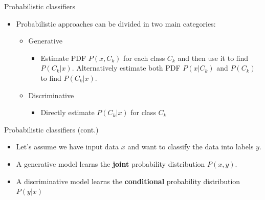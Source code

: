\documentclass[serif, aspectratio=169]{beamer}
\begin{document}
    \begin{frame}{Probabilistic classifiers}
        \begin{itemize}
            \item Probabilistic approaches can be divided in two main categories:
            \begin{itemize}
                \item Generative
                \begin{itemize}
                    \item Estimate PDF $P(x, C_k)$ for each class $C_k$ and then use it to find $P(C_k|x)$. Alternatively estimate both PDF $P(x|C_k)$ and $P(C_k)$ to find $P(C_k|x)$.
                \end{itemize}
                \item Discriminative
                \begin{itemize}
                    \item Directly estimate $P(C_k|x)$ for class $C_k$
                \end{itemize}
            \end{itemize}
        \end{itemize}
    \end{frame}
    \begin{frame}{Probabilistic classifiers (cont.)}
        \begin{itemize}
            \item Let's assume we have input data $x$ and want to classify the data into labels $y$.
            \item A generative model learns the \textbf{joint} probability distribution $P(x,y)$.

            \item A discriminative model learns the \textbf{conditional} probability distribution $P(y|x)$

        \end{itemize}
    \end{frame}
\end{document}
